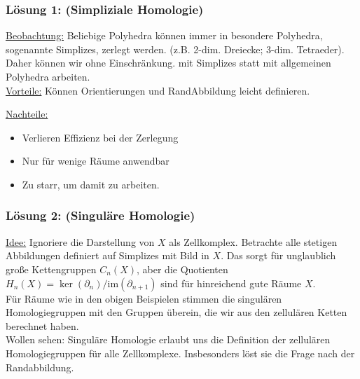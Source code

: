 \documentclass[fleqn, 12pt, letterpaper]{article}
\begin{document}
\subsubsection*{Lösung 1: (Simpliziale Homologie)}
\underline{Beobachtung:} Beliebige Polyhedra können immer in besondere Polyhedra, sogenannte Simplizes, zerlegt werden. (z.B. 2-dim. Dreiecke; 3-dim. Tetraeder). Daher können wir ohne Einschränkung. mit Simplizes statt mit allgemeinen Polyhedra arbeiten.\\

\underline{Vorteile:} Können Orientierungen und RandAbbildung leicht definieren.

\underline{Nachteile:} 
\begin{itemize}
  \item Verlieren Effizienz bei der Zerlegung
  \item Nur für wenige Räume anwendbar
  \item Zu starr, um damit zu arbeiten.
\end{itemize}

\subsubsection*{Lösung 2: (Singuläre Homologie)}

\underline{Idee:} Ignoriere die Darstellung von \( X \) als Zellkomplex.
Betrachte alle stetigen Abbildungen definiert auf Simplizes mit Bild in \( X \).
Das sorgt für unglaublich große Kettengruppen \( C_n(X) \), aber die Quotienten \( H_n(X) = \ker(\partial_n)/\mathrm{im}(\partial_{n+1}) \) sind für hinreichend gute Räume \( X \).\\

Für Räume wie in den obigen Beispielen stimmen die singulären Homologiegruppen mit den Gruppen überein, die wir aus den zellulären Ketten berechnet haben.\\

Wollen sehen: Singuläre Homologie erlaubt uns die Definition der zellulären Homologiegruppen für alle Zellkomplexe. Insbesonders löst sie die Frage nach der Randabbildung.

\end{document}

